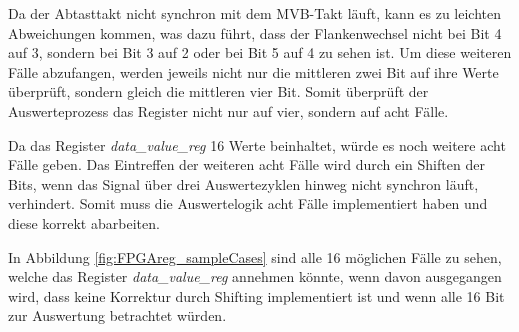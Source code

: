 




Da der Abtasttakt nicht synchron mit dem MVB-Takt läuft, kann es zu leichten Abweichungen kommen, was dazu führt, dass der Flankenwechsel nicht bei Bit 4 auf 3, sondern bei Bit 3 auf 2 oder bei Bit 5 auf 4 zu sehen ist. Um diese weiteren Fälle abzufangen, werden jeweils nicht nur die 
mittleren zwei Bit auf ihre Werte überprüft, sondern gleich die mittleren vier Bit. Somit überprüft der Auswerteprozess das Register nicht nur auf vier, sondern auf acht Fälle.

Da das Register \textit{data\_value\_reg} 16 Werte beinhaltet, würde es noch weitere acht Fälle
geben. Das Eintreffen der weiteren acht Fälle wird durch ein Shiften der Bits, wenn das Signal über
drei Auswertezyklen hinweg nicht synchron läuft, verhindert. Somit muss die Auswertelogik acht  
Fälle implementiert haben und diese korrekt abarbeiten.

In Abbildung \ref{fig:FPGAreg_sampleCases} sind alle 16 möglichen Fälle zu 
sehen, welche das Register \textit{data\_value\_reg} annehmen könnte, wenn davon 
ausgegangen wird, dass keine Korrektur durch Shifting implementiert ist und wenn
alle 16 Bit zur Auswertung betrachtet würden.

